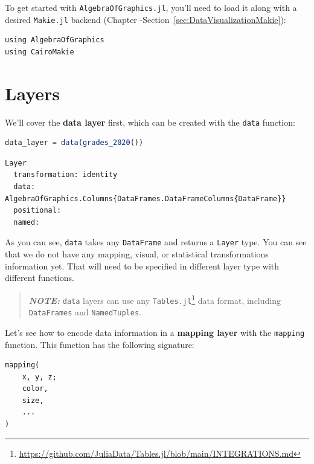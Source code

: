 \documentclass[
  notoc %
]{tufte-book}
\DeclareRobustCommand{\href}[2]{#2\footnote{\url{#1}}}
\newcommand{\passthrough}[1]{#1}
\begin{document}
To get started with \passthrough{\lstinline!AlgebraOfGraphics.jl!},
you'll need to load it along with a desired
\passthrough{\lstinline!Makie.jl!} backend (Chapter
-Section~\ref{sec:DataVisualizationMakie}):

\begin{lstlisting}
using AlgebraOfGraphics
using CairoMakie
\end{lstlisting}

\hypertarget{sec:aog_layers}{%
\section{Layers}\label{sec:aog_layers}}

We'll cover the \textbf{data layer} first, which can be created with the
\passthrough{\lstinline!data!} function:

\begin{lstlisting}[language=Julia]
data_layer = data(grades_2020())
\end{lstlisting}

\begin{lstlisting}[language=Output]
Layer 
  transformation: identity
  data: AlgebraOfGraphics.Columns{DataFrames.DataFrameColumns{DataFrame}}
  positional:
  named:

\end{lstlisting}

As you can see, \passthrough{\lstinline!data!} takes any
\passthrough{\lstinline!DataFrame!} and returns a
\passthrough{\lstinline!Layer!} type. You can see that we do not have
any mapping, visual, or statistical transformations information yet.
That will need to be specified in different layer type with different
functions.

\begin{quote}
\textbf{\emph{NOTE:}} \passthrough{\lstinline!data!} layers can use any
\href{https://github.com/JuliaData/Tables.jl/blob/main/INTEGRATIONS.md}{\passthrough{\lstinline!Tables.jl!}}
data format, including \passthrough{\lstinline!DataFrames!} and
\passthrough{\lstinline!NamedTuples!}.
\end{quote}

Let's see how to encode data information in a \textbf{mapping layer}
with the \passthrough{\lstinline!mapping!} function. This function has
the following signature:

\begin{lstlisting}
mapping(
    x, y, z;
    color,
    size,
    ...
)
\end{lstlisting}
\end{document}
